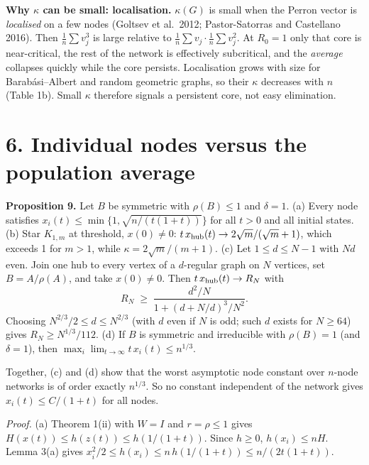 \documentclass[
  11pt,
  a4paper,
]{article}
\begin{document}
\textbf{Why \(\kappa\) can be small: localisation.} \(\kappa(G)\) is
small when the Perron vector is \emph{localised} on a few nodes (Goltsev
et al.~2012; Pastor-Satorras and Castellano 2016). Then
\(\frac1n\sum v_j^3\) is large relative to
\(\frac1n\sum v_j\cdot\frac1n\sum v_j^2\). At \(R_0=1\) only that core
is near-critical, the rest of the network is effectively subcritical,
and the \emph{average} collapses quickly while the core persists.
Localisation grows with size for Barabási--Albert and random geometric
graphs, so their \(\kappa\) decreases with \(n\) (Table 1b). Small
\(\kappa\) therefore signals a persistent core, not easy elimination.

\section{6. Individual nodes versus the population
average}\label{individual-nodes-versus-the-population-average}

\textbf{Proposition 9.} Let \(B\) be symmetric with \(\rho(B)\le1\) and
\(\delta=1\). (a) Every node satisfies
\(x_i(t)\le\min\{1,\sqrt{n/(t(1+t))}\}\) for all \(t>0\) and all initial
states. (b) Star \(K_{1,m}\) at threshold, \(x(0)\neq0\):
\(t\,x_{\rm hub}(t)\to2\sqrt m/(\sqrt m+1)\), which exceeds 1 for
\(m>1\), while \(\kappa=2\sqrt m/(m+1)\). (c) Let \(1\le d\le N-1\) with
\(Nd\) even. Join one hub to every vertex of a \(d\)-regular graph on
\(N\) vertices, set \(B=A/\rho(A)\), and take \(x(0)\neq0\). Then
\(t\,x_{\rm hub}(t)\to R_N\) with
\[R_N\;\ge\;\frac{d^2/N}{1+(d+N/d)^3/N^2}. \tag{6.1}\] Choosing
\(N^{2/3}/2\le d\le N^{2/3}\) (with \(d\) even if \(N\) is odd; such
\(d\) exists for \(N\ge 64\)) gives \(R_N\ge N^{1/3}/112\). (d) If \(B\)
is symmetric and irreducible with \(\rho(B)=1\) (and \(\delta=1\)), then
\(\max_i\lim_{t\to\infty}t\,x_i(t)\le n^{1/3}\).

Together, (c) and (d) show that the worst asymptotic node constant over
\(n\)-node networks is of order exactly \(n^{1/3}\). So no constant
independent of the network gives \(x_i(t)\le C/(1+t)\) for all nodes.

\emph{Proof.} (a) Theorem 1(ii) with \(W=I\) and \(r=\rho\le1\) gives
\(H(x(t))\le h(z(t))\le h(1/(1+t))\). Since \(h\ge0\), \(h(x_i)\le nH\).
Lemma 3(a) gives \(x_i^2/2\le h(x_i)\le n\,h(1/(1+t))\le n/(2t(1+t))\).
\end{document}
